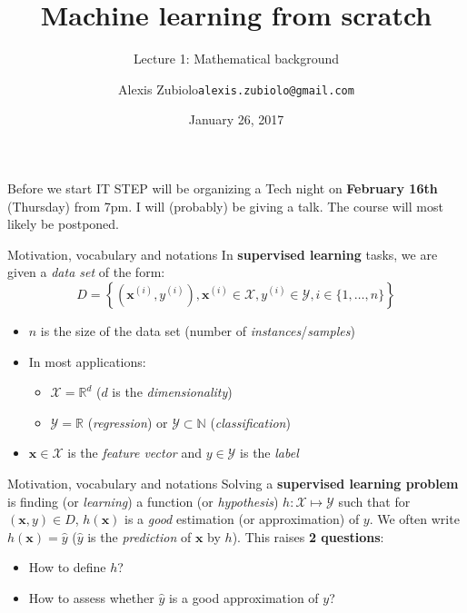 \documentclass{beamer}
\title[Course presentation]{Machine learning from scratch}
\subtitle{Lecture 1: Mathematical background}
\author{Alexis Zubiolo\newline\texttt{alexis.zubiolo@gmail.com}}
\institute{Data Science Team Lead @ Adcash}
\date{January 26, 2017}
\newcommand{\X}{\mathcal{X}}
\newcommand{\Y}{\mathcal{Y}}
\newcommand{\real}{\mathbb{R}}
\newcommand{\N}{\mathbb{N}}
\newcommand{\yhat}{\hat{y}}
\newcommand{\bxi}{\bm{x}^{(i)}}
\newcommand{\bx}{\bm{x}}
\newcommand{\yi}{y^{(i)}}
\begin{document}
\begin{frame}
  \titlepage
\end{frame}

\begin{frame}{Before we start}
IT STEP will be organizing a Tech night on \textbf{February 16th} (Thursday) from 7pm. I will (probably) be giving a talk. The course will most likely be postponed.
\end{frame}

\begin{frame}{Motivation, vocabulary and notations}
In \textbf{supervised learning} tasks, we are given a \textit{data set} of the form:
$$ D = \left\{ \left(\bxi, \yi\right), \bxi \in \X, \yi \in \Y, i \in \{1, \dots, n \}  \right\}$$
\pause
\begin{itemize}
	\item $n$ is the size of the data set (number of \textit{instances}/\textit{samples})
	\item In most applications:
	\begin{itemize}
		\item $\X = \real^d$ ($d$ is the \textit{dimensionality})
		\item $\Y = \real$ (\textit{regression}) or $\Y \subset \N$ (\textit{classification})
	\end{itemize}		
	\item $\bx \in \X$ is the \textit{feature vector} and $y \in \Y$ is the \textit{label}
\end{itemize}
\end{frame}

\begin{frame}{Motivation, vocabulary and notations}
Solving a \textbf{supervised learning problem} is finding (or \textit{learning}) a function (or \textit{hypothesis}) $h : \X \mapsto \Y$ such that for $(\bx, y)\in D$, $h(\bx)$ is a \textit{good} estimation  (or approximation) of $y$.
\pause
\vfill
We often write $h(\bx) = \yhat$ ($\yhat$ is the \textit{prediction} of $\bx$ by $h$).
\pause
\vfill
This raises \textbf{2 questions}:
\begin{itemize}
	\item How to define $h$?
	\item How to assess whether $\yhat$ is a good approximation of $y$?
\end{itemize}
\end{frame}
\end{document}
